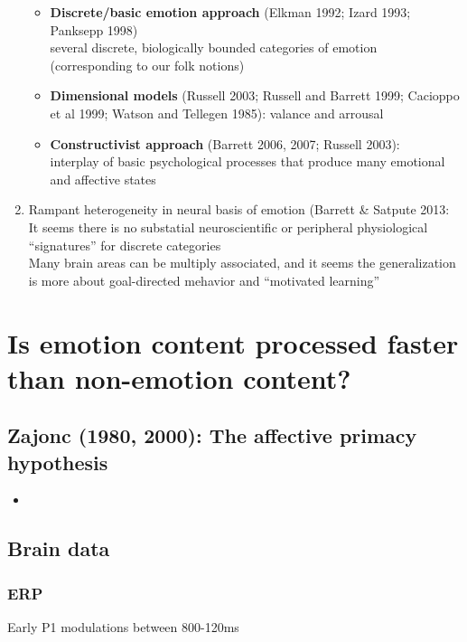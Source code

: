 \documentclass[12pt,letterpaper,table,svgnames,dvipsnames]{article}
\begin{document}
\begin{enumerate}
\begin{itemize}
            \item \textbf{Discrete/basic emotion approach} (Elkman 1992; Izard 1993; Panksepp 1998)\\
            several discrete, biologically bounded categories of emotion (corresponding to our folk notions)

            \item \textbf{Dimensional models} (Russell 2003; Russell and Barrett 1999; Cacioppo et al 1999; Watson and Tellegen 1985):
            valance and arrousal

            \item \textbf{Constructivist approach} (Barrett 2006, 2007; Russell 2003):\\
            interplay of basic psychological processes that produce many emotional and affective states
        \end{itemize}

    \item Rampant heterogeneity in neural basis of emotion (Barrett \& Satpute 2013:
    It seems there is no substatial neuroscientific or peripheral physiological ``signatures'' for discrete categories\\
    Many brain areas can be multiply associated, and it seems the generalization is more about goal-directed mehavior and ``motivated learning''


\end{enumerate}




\section{Is emotion content processed faster than non-emotion content?}

\subsection{Zajonc (1980, 2000): The affective primacy hypothesis}
\begin{itemize}[noitemsep]
    \item 
\end{itemize}

\subsection{Brain data}

\subsubsection{ERP}
Early P1 modulations between 800-120ms 
\end{document}

